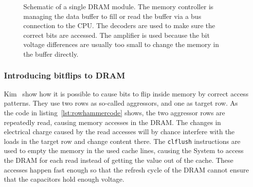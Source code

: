 \begin{figure}
  \centering
  \caption{Schematic of a single DRAM module. The memory controller is managing
the data buffer to fill or read the buffer via a bus connection to the CPU. The
decoders are used to make sure the correct bits are accessed. The amplifier is
used because the bit voltage differences are usually too small to change the
memory in the buffer directly.}
  \label{fig:DRAMscheme}
\end{figure}

\subsubsection{Introducing bitflips to DRAM}

Kim~\etal\cite{rowhammergeneral} show how it is possible to cause bits to flip
inside memory by correct access patterns. They use two rows as so-called
aggressors, and one as target row. As the code in
listing~\ref{lst:rowhammercode} shows, the two aggressor rows are repeatedly
read, causing memory accesses in the DRAM. The changes in electrical charge
caused by the read accesses will by chance interfere with the loads in the
target row and change content there. The \texttt{clflush} instructions are used
to empty the memory in the used cache lines, causing the System to access the
DRAM for each read instead of getting the value out of the cache. These accesses
happen fast enough so that the refresh cycle of the DRAM cannot ensure that the
capacitors hold enough voltage.

